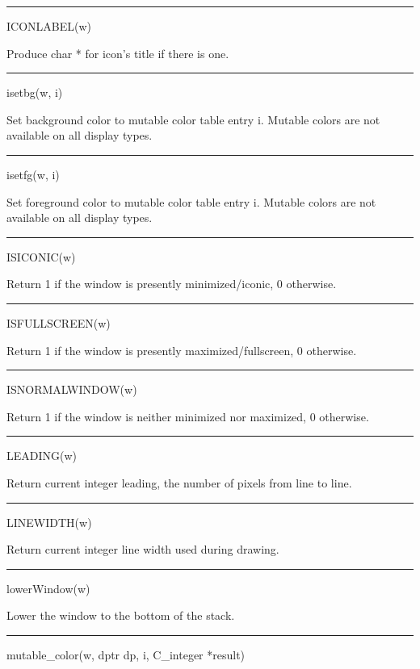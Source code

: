 {\sffamily\bfseries
\bigskip\hrule\vspace{0.1cm}
\noindent
ICONLABEL(w)}


Produce char * for icon's title if there is one.


{\sffamily\bfseries
\bigskip\hrule\vspace{0.1cm}
\noindent
isetbg(w, i)}


Set background color to mutable color table entry i. Mutable colors
are not available on all display types.


{\sffamily\bfseries
\bigskip\hrule\vspace{0.1cm}
\noindent
isetfg(w, i)}


Set foreground color to mutable color table entry i. Mutable colors
are not available on all display types.


{\sffamily\bfseries
\bigskip\hrule\vspace{0.1cm}
\noindent
ISICONIC(w)}


Return 1 if the window is presently minimized/iconic, 0 otherwise.


{\sffamily\bfseries
\bigskip\hrule\vspace{0.1cm}
\noindent
ISFULLSCREEN(w)}


Return 1 if the window is presently maximized/fullscreen, 0 otherwise.


{\sffamily\bfseries
\bigskip\hrule\vspace{0.1cm}
\noindent
ISNORMALWINDOW(w)}


Return 1 if the window is neither minimized nor maximized, 0 otherwise.


{\sffamily\bfseries
\bigskip\hrule\vspace{0.1cm}
\noindent
LEADING(w)}


Return current integer leading, the number of pixels from line to line.


{\sffamily\bfseries
\bigskip\hrule\vspace{0.1cm}
\noindent
LINEWIDTH(w)}


Return current integer line width used during drawing.


{\sffamily\bfseries
\bigskip\hrule\vspace{0.1cm}
\noindent
lowerWindow(w)}


Lower the window to the bottom of the stack.


{\sffamily\bfseries
\bigskip\hrule\vspace{0.1cm}
\noindent
mutable\_color(w, dptr dp, i, C\_integer *result)}



